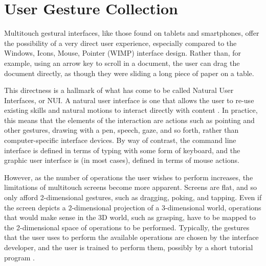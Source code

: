 \chapter{User Gesture Collection}

Multitouch gestural interfaces, like those found on tablets and smartphones, offer the possibility of a very direct user experience, especially compared to the Windows, Icons, Mouse, Pointer (WIMP) interface design. 
Rather than, for example, using an arrow key to scroll in a document, the user can drag the document directly, as though they were sliding a long piece of paper on a table. 

This directness is a hallmark of what has come to be called Natural User Interfaces, or NUI. 
A natural user interface is one that allows the user to re-use existing skills and natural motions to interact directly with content \citep{blakeNUIWin}. 
In practice, this means that the elements of the interaction are actions such as pointing and other gestures, drawing with a pen, speech, gaze, and so forth, rather than computer-specific interface devices. 
By way of contrast, the command line interface is defined in terms of typing with some form of keyboard, and the graphic user interface is (in most cases), defined in terms of mouse actions. 

However, as the number of operations the user wishes to perform increases, the limitations of multitouch screens become more apparent. 
Screens are flat, and so only afford 2-dimensional gestures, such as dragging, poking, and tapping. 
Even if the screen depicts a 2-dimensional projection of a 3-dimensional world, operations that would make sense in the 3D world, such as grasping, have to be mapped to the 2-dimensional space of operations to be performed. 
Typically, the gestures that the user uses to perform the available operations are chosen by the interface developer, and the user is trained to perform them, possibly by a short tutorial program \citep{wobbrock2009user, vanacken2008ghosts, freeman2009shadowguides}. 

